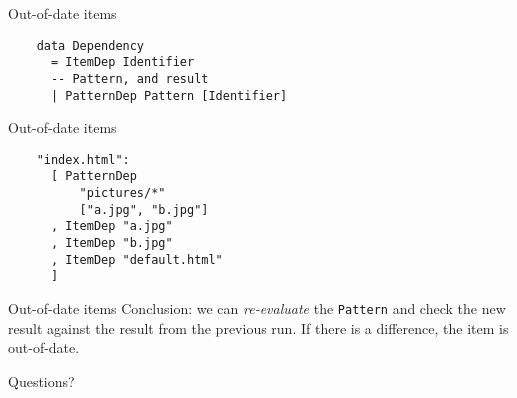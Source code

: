 \documentclass[20pt]{beamer}
\newcommand{\chapterslide}[1]{
    {
        \begin{frame}[plain]
        \begin{center}
        \large{#1}
        \end{center}
        \end{frame}
    }
}
\newcommand{\code}[1]{
    \texttt{\small{#1}}
}
\begin{document}
\begin{frame}[fragile]{Out-of-date items}
    \begin{lstlisting}
    data Dependency
      = ItemDep Identifier
      -- Pattern, and result
      | PatternDep Pattern [Identifier]
    \end{lstlisting}
\end{frame}

\begin{frame}[fragile]{Out-of-date items}
    \begin{lstlisting}
    "index.html":
      [ PatternDep
          "pictures/*"
          ["a.jpg", "b.jpg"]
      , ItemDep "a.jpg"
      , ItemDep "b.jpg"
      , ItemDep "default.html"
      ]
    \end{lstlisting}
\end{frame}

\begin{frame}{Out-of-date items}
    Conclusion: we can \emph{re-evaluate} the \code{Pattern} and check the new
    result against the result from the previous run.  If there is a difference,
    the item is out-of-date.
\end{frame}

\chapterslide{Questions?}
\end{document}
